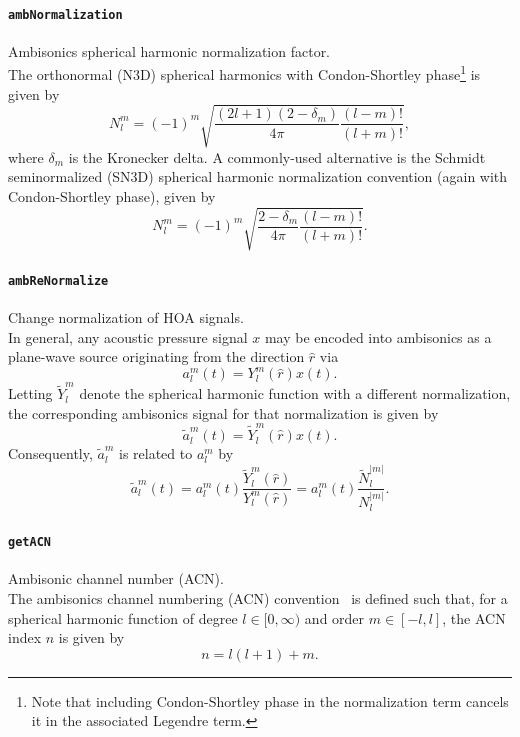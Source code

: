 \documentclass[11pt, oneside]{article}
\newcommand{\function}[1]{\paragraph*{\texttt{#1}}}
\begin{document}
\function{ambNormalization} Ambisonics spherical harmonic normalization factor. \\
The orthonormal (N3D) spherical harmonics with Condon-Shortley phase\footnote{Note that including Condon-Shortley phase in the normalization term cancels it in the associated Legendre term.} is given by
\begin{equation}\label{eq:ambNormalization_N3D}
N_l^m = (-1)^m \sqrt{\frac{(2l+1)(2 - \delta_m)}{4 \pi} \frac{(l-m)!}{(l+m)!}},
\end{equation}
where $\delta_m$ is the Kronecker delta.
A commonly-used alternative is the Schmidt seminormalized (SN3D) spherical harmonic normalization convention (again with Condon-Shortley phase), given by~\citep{Nachbar2011}
\begin{equation}\label{eq:ambNormalization_SN3D}
N_l^m = (-1)^m \sqrt{\frac{2 - \delta_m}{4 \pi} \frac{(l-m)!}{(l+m)!}}.
\end{equation}

\function{ambReNormalize} Change normalization of HOA signals. \\
In general, any acoustic pressure signal $x$ may be encoded into ambisonics as a plane-wave source originating from the direction $\hat{r}$ via
\begin{equation}
a_l^m(t) = Y_l^m(\hat{r}) x(t).
\end{equation}
Letting $\tilde{Y}_l^m$ denote the spherical harmonic function with a different normalization, the corresponding ambisonics signal for that normalization is given by
\begin{equation}
\tilde{a}_l^m(t) = \tilde{Y}_l^m(\hat{r}) x(t).
\end{equation}
Consequently, $\tilde{a}_l^m$ is related to $a_l^m$ by
\begin{equation}
\tilde{a}_l^m(t) = a_l^m(t) \frac{\tilde{Y}_l^m(\hat{r})}{Y_l^m(\hat{r})} = a_l^m(t) \frac{\tilde{N}_l^{|m|}}{N_l^{|m|}}.
\end{equation}


\function{getACN} Ambisonic channel number (ACN). \\
The ambisonics channel numbering (ACN) convention~\citep{Nachbar2011} is defined such that, for a spherical harmonic function of degree $l \in [0,\infty)$ and order $m \in [-l,l]$, the ACN index $n$ is given by
\begin{equation}\label{eq:getACN}
n = l (l + 1) + m.
\end{equation}
\end{document}
